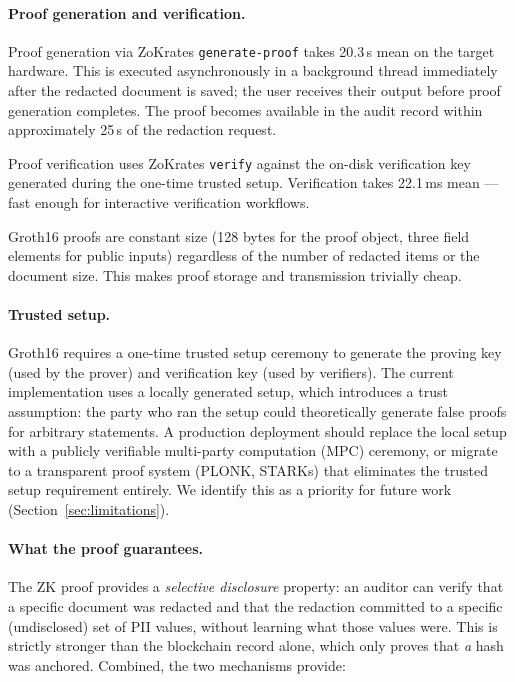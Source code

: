 \paragraph{Proof generation and verification.}
Proof generation via ZoKrates \texttt{generate-proof}
takes 20.3\,s mean on the target hardware.
This is executed asynchronously in a background
thread immediately after the redacted document is
saved; the user receives their output before proof
generation completes.
The proof becomes available in the audit record
within approximately 25\,s of the redaction request.

Proof verification uses ZoKrates \texttt{verify}
against the on-disk verification key generated
during the one-time trusted setup.
Verification takes 22.1\,ms mean ---
fast enough for interactive verification workflows.

Groth16 proofs are constant size (128 bytes for the
proof object, three field elements for public inputs)
regardless of the number of redacted items or the
document size.
This makes proof storage and transmission trivially
cheap.

\paragraph{Trusted setup.}
Groth16 requires a one-time trusted setup ceremony
to generate the proving key (used by the prover) and
verification key (used by verifiers).
The current implementation uses a locally generated
setup, which introduces a trust assumption: the party
who ran the setup could theoretically generate false
proofs for arbitrary statements.
A production deployment should replace the local
setup with a publicly verifiable multi-party
computation (MPC) ceremony, or migrate to a
transparent proof system (PLONK, STARKs) that
eliminates the trusted setup requirement entirely.
We identify this as a priority for future work
(Section~\ref{sec:limitations}).

\paragraph{What the proof guarantees.}
The ZK proof provides a \emph{selective disclosure}
property: an auditor can verify that a specific
document was redacted and that the redaction
committed to a specific (undisclosed) set of PII
values, without learning what those values were.
This is strictly stronger than the blockchain
record alone, which only proves that \emph{a}
hash was anchored.
Combined, the two mechanisms provide:


